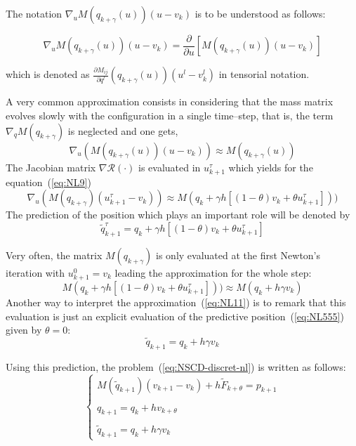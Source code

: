 \begin{remark}
The notation $\nabla_{u}M(q_{k+\gamma}(u))(u-v_{k})$ is to be understood as follows:

$$\nabla_{u}M(q_{k+\gamma}(u))(u-v_{k})=\frac{\partial}{\partial u}[M(q_{k+\gamma}(u))(u-v_{k})]$$

which is denoted as $\frac{\partial M_{ij}}{\partial q^{l}}(q_{k+\gamma}(u))(u^{l}-v_{k}^{l})$ in tensorial notation.
\label{remarkBABAS}
\end{remark}



A very common approximation consists in considering that the mass matrix evolves slowly with the configuration in a single time--step, that is, the term $\nabla_{q} M(q_{k+\gamma})$ is neglected and one gets,
\begin{equation}
  \label{eq:NL9}
    \nabla_u  (M(q_{k+\gamma}(u) ) (u-v_{k})) \approx  M(q_{k+\gamma}(u) )
\end{equation}
The Jacobian matrix $\nabla \mathcal R (\cdot)$ is evaluated in $u^{\tau}_{k+1}$ which yields for the  equation~(\ref{eq:NL9})
\begin{equation}
  \label{eq:NL10}
    \nabla_u  (M(q_{k+\gamma} ) (u^{\tau}_{k+1}-v_{k})) \approx  M(q_k + \gamma h [(1-\theta)v_k+\theta u^{\tau}_{k+1}] ) )
\end{equation}
The prediction of the position which plays an important role will be denoted by
\begin{equation}
  \label{eq:NL555}
  \tilde q^{\tau}_{k+1}= q_k + \gamma h [(1-\theta)v_k+\theta u^{\tau}_{k+1}]
\end{equation}


Very often, the  matrix $M(q_{k+\gamma})$ is only  evaluated at the first Newton's iteration with $u^{0}_{k+1}= v_k$ leading the approximation for the whole step:
\begin{equation}
M(q_k + \gamma h [(1-\theta)v_k+\theta u^{\tau}_{k+1}] ) )\approx M(q_k + h \gamma v_k)
\label{eq:NL11}
\end{equation}
Another way to interpret the approximation~(\ref{eq:NL11}) is to remark that this evaluation is just an explicit evaluation of the predictive position~(\ref{eq:NL555}) given by $\theta=0$:
\begin{equation}
  \label{eq:NL5}
  \tilde q_{k+1}= q_k + h \gamma v_k
\end{equation}

Using this prediction, the problem~(\ref{eq:NSCD-discret-nl}) is written as follows:
\begin{equation}
\label{eq:NSCD-discret2}
\begin{cases}
    M(\tilde q_{k+1}) (v_{k+1}-v_{k}) + h \tilde F_{k+\theta} = p_{k+1} \\  \\
    q_{k+1} = q_{k} +  h v_{k+\theta} \\ \\
    \tilde q_{k+1}= q_k + h \gamma v_k
\end{cases}
\end{equation}


